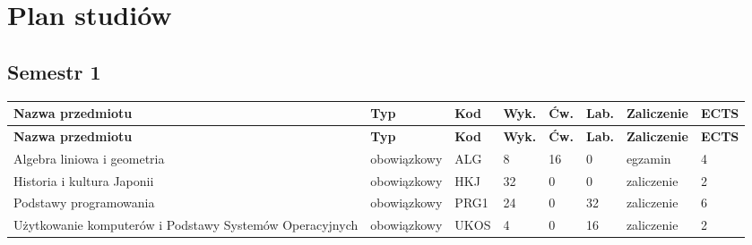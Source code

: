 \documentclass[12pt,a4paper]{article}
\newcommand{\thdrule}{\noalign{\global\setlength{\extrarowheight}{0pt}}}
\newcommand{\thdend}{\noalign{\global\setlength{\extrarowheight}{4pt}}}
\begin{document}
\newpage

\section{Plan studiów}


\bigskip

\subsection*{Semestr 1}

{\scriptsize
\begin{longtable}{>{\RaggedRight}m{5.0cm}m{1.9cm}m{0.75cm}m{0.85cm}m{0.85cm}m{0.85cm}m{1.45cm}m{0.9cm}}
\thdrule\toprule
\rowcolor{pjatkRed}
{\color{white}\footnotesize\textbf{\vphantom{Ag}Nazwa przedmiotu}} & {\color{white}\footnotesize\textbf{\vphantom{Ag}Typ}} & {\color{white}\footnotesize\textbf{\vphantom{Ag}Kod}} & {\color{white}\footnotesize\textbf{\vphantom{Ag}Wyk.}} & {\color{white}\footnotesize\textbf{\vphantom{Ag}Ćw.}} & {\color{white}\footnotesize\textbf{\vphantom{Ag}Lab.}} & {\color{white}\footnotesize\textbf{\vphantom{Ag}Zaliczenie}} & {\color{white}\footnotesize\textbf{\vphantom{Ag}ECTS}} \\
\midrule\thdend
\endfirsthead
\thdrule\toprule
\rowcolor{pjatkRed}
{\color{white}\footnotesize\textbf{\vphantom{Ag}Nazwa przedmiotu}} & {\color{white}\footnotesize\textbf{\vphantom{Ag}Typ}} & {\color{white}\footnotesize\textbf{\vphantom{Ag}Kod}} & {\color{white}\footnotesize\textbf{\vphantom{Ag}Wyk.}} & {\color{white}\footnotesize\textbf{\vphantom{Ag}Ćw.}} & {\color{white}\footnotesize\textbf{\vphantom{Ag}Lab.}} & {\color{white}\footnotesize\textbf{\vphantom{Ag}Zaliczenie}} & {\color{white}\footnotesize\textbf{\vphantom{Ag}ECTS}} \\
\midrule\thdend
\endhead
\rowcolor{tableRowLight} Algebra liniowa i geometria & {\scriptsize obowiązkowy} & ALG & 8 & 16 & 0 & {\scriptsize egzamin} & 4 \\
\rowcolor{tableRowAlt} Historia i kultura Japonii & {\scriptsize obowiązkowy} & HKJ & 32 & 0 & 0 & {\scriptsize zaliczenie} & 2 \\
\rowcolor{tableRowLight} Podstawy programowania & {\scriptsize obowiązkowy} & PRG1 & 24 & 0 & 32 & {\scriptsize zaliczenie} & 6 \\
\rowcolor{tableRowAlt} Użytkowanie komputerów i Podstawy Systemów Operacyjnych & {\scriptsize obowiązkowy} & UKOS & 4 & 0 & 16 & {\scriptsize zaliczenie} & 2 \\

\end{longtable}}
\end{document}

